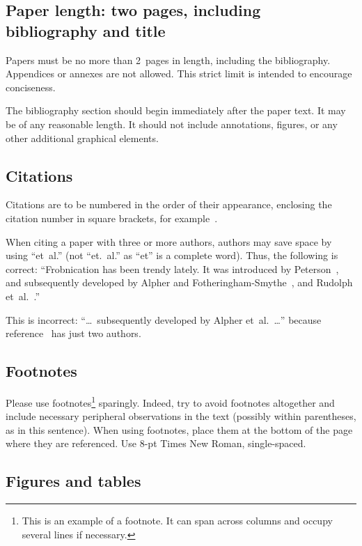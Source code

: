 \documentclass[extendedabs]{recpad2k}
\begin{document}
\subsection{Paper length: two pages, including bibliography and title}
Papers must be no more than 2~pages in length, including the bibliography. Appendices or annexes are not allowed. This strict limit is intended to encourage conciseness.

The bibliography section should begin immediately after the paper text. It may be of any reasonable length. It should not include annotations, figures, or any other additional graphical elements.

\subsection{Citations}

Citations are to be numbered in the order of their appearance, enclosing the citation number in square brackets, for example~\cite{Peterson2002}.

When citing a paper with three or more authors, authors may save space by using ``et~al.'' (not ``et.~al.'' as ``et'' is a complete word). Thus, the following is correct: ``Frobnication has been trendy lately. It was introduced by Peterson~\cite{Peterson2002}, and subsequently developed by Alpher and Fotheringham-Smythe~\cite{AlpherFotheringhamSmythe2003}, and Rudolph
et~al.~\cite{Rudolph2004}.''

This is incorrect: ``\ldots\ subsequently developed by Alpher et~al.~\cite{AlpherFotheringhamSmythe2003}\ldots'' because reference~\cite{AlpherFotheringhamSmythe2003} has just two authors.

\subsection{Footnotes}

Please use footnotes\footnote{This is an example of a footnote. It can span across columns and occupy several lines if necessary.} sparingly. Indeed, try to avoid footnotes altogether and include necessary peripheral observations in the text (possibly within parentheses, as in this sentence). When using footnotes, place them at the bottom of the page where they are referenced. Use 8-pt Times New Roman, single-spaced.

\subsection{Figures and tables}
\end{document}

